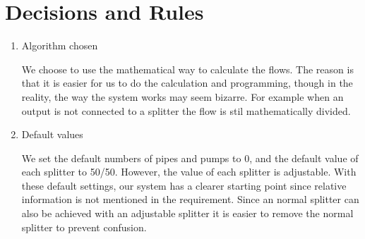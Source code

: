 \chapter{Decisions and Rules}
\begin{enumerate}
	\item Algorithm chosen
	
	We choose to use the mathematical way to calculate the flows. The reason is that it is easier for us to do the calculation and programming, though in the reality, the way the system works may seem bizarre. For example when an output is not connected to a splitter the flow is stil mathematically divided.
	\item Default values
	
	We set the default numbers of pipes and pumps to 0, and the default value of each splitter to 50/50. However, the value of each splitter is adjustable. With these default settings, our system has a clearer starting point since relative information is not mentioned in the requirement. Since an normal splitter can also be achieved with an adjustable splitter it is easier to remove the normal splitter to prevent confusion.
\end{enumerate} 